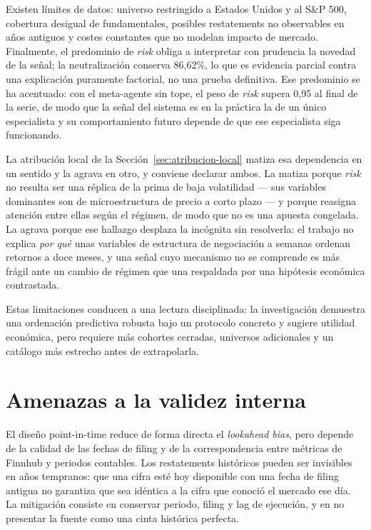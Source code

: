 Existen límites de datos: universo restringido a Estados Unidos y al S\&P 500, cobertura desigual
de fundamentales, posibles restatements no observables en años antiguos y costes constantes que no
modelan impacto de mercado. Finalmente, el predominio de \textit{risk} obliga a interpretar con
prudencia la novedad de la señal; la neutralización conserva 86,62\%, lo que es evidencia parcial
contra una explicación puramente factorial, no una prueba definitiva. Ese predominio se ha
acentuado: con el meta-agente sin tope, el peso de \textit{risk} supera 0,95 al final de la serie,
de modo que la señal del sistema es en la práctica la de un único especialista y su comportamiento
futuro depende de que ese especialista siga funcionando.

La atribución local de la Sección~\ref{sec:atribucion-local} matiza esa dependencia en un sentido y
la agrava en otro, y conviene declarar ambos. La matiza porque \textit{risk} no resulta ser una
réplica de la prima de baja volatilidad --- sus variables dominantes son de microestructura de
precio a corto plazo --- y porque reasigna atención entre ellas según el régimen, de modo que no es
una apuesta congelada. La agrava porque ese hallazgo desplaza la incógnita sin resolverla: el
trabajo no explica \emph{por qué} unas variables de estructura de negociación a semanas ordenan
retornos a doce meses, y una señal cuyo mecanismo no se comprende es más frágil ante un cambio de
régimen que una respaldada por una hipótesis económica contrastada.

Estas limitaciones conducen a una lectura disciplinada: la investigación demuestra una ordenación
predictiva robusta bajo un protocolo concreto y sugiere utilidad económica, pero requiere más
cohortes cerradas, universos adicionales y un catálogo más estrecho antes de extrapolarla.

\section{Amenazas a la validez interna}

El diseño point-in-time reduce de forma directa el \textit{lookahead bias}, pero depende de la
calidad de las fechas de filing y de la correspondencia entre métricas de Finnhub y periodos
contables. Los restatements históricos pueden ser invisibles en años tempranos: que una cifra esté
hoy disponible con una fecha de filing antigua no garantiza que sea idéntica a la cifra que conoció
el mercado ese día. La mitigación consiste en conservar periodo, filing y lag de ejecución, y en no
presentar la fuente como una cinta histórica perfecta.

